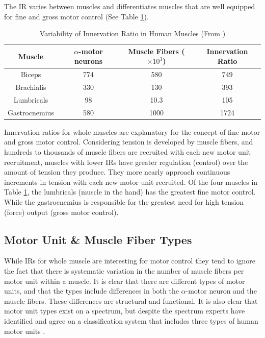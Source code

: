 The IR varies between muscles and differentiates muscles that are well equipped for fine and gross motor control (See Table \ref{table:Innervation_Ratios}).

\begin{table}[h!]
\centering
\begin{tabular}{||c c c c||} 
 \hline
 Muscle & $\alpha$-motor neurons & Muscle Fibers ($\times 10^3$) & Innervation Ratio \\ [0.5ex] 
 \hline\hline
 Biceps  & 774 & 580 & 749 \\ 
 Brachialis & 330 & 130 & 393 \\
 Lumbricals &  98 & 10.3 & 105 \\ 
 Gastrocnemius & 580 & 1000 & 1724 \\[1ex] 
 \hline
\end{tabular}
\caption{Variability of Innervation Ratio in Human Muscles (\footnotesize{From \cite{buchthal_motor_1980}})}
\label{table:Innervation_Ratios}
\end{table}

Innervation ratios for whole muscles are explanatory for the concept of fine motor and gross motor control. Considering tension is developed by muscle fibers, and hundreds to thousands of muscle fibers are recruited with each new motor unit recruitment, muscles with lower IRs have greater regulation (control) over the amount of tension they produce. They more nearly approach continuous increments in tension with each new motor unit recruited. Of the four muscles in Table \ref{table:Innervation_Ratios}, the lumbricals (muscle in the hand) has the greatest fine motor control. While the gastrocnemius is responsible for the greatest need for high tension (force) output (gross motor control).

\subsection{Motor Unit \& Muscle Fiber Types}

While IRs for whole muscle are interesting for motor control they tend to ignore the fact that there is systematic variation in the number of muscle fibers per motor unit within a muscle. It is clear that there are different types of motor units, and that the types include differences in both the $\alpha$-motor neuron and the muscle fibers. These differences are structural and functional. It is also clear that motor unit types exist on a spectrum, but despite the spectrum experts have identified and agree on a classification system that includes three types of human motor units \cite{lieber_skeletal_2010}.

